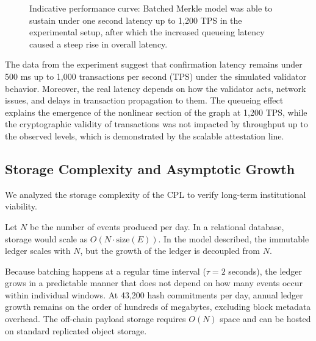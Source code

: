 \documentclass[conference]{IEEEtran}
\begin{document}
\begin{figure}[htbp]
\centering
{}
\caption{Indicative performance curve: Batched Merkle model was able to sustain under one second latency up to 1,200 TPS in the experimental setup, after which the increased queueing latency caused a steep rise in overall latency.}
\label{fig:throughput}
\end{figure}

The data from the experiment suggest that confirmation latency remains under 500 ms up to 1,000 transactions per second (TPS) under the simulated validator behavior. Moreover, the real latency depends on how the validator acts, network issues, and delays in transaction propagation to them. The queueing effect explains the emergence of the nonlinear section of the graph at 1,200 TPS, while the cryptographic validity of transactions was not impacted by throughput up to the observed levels, which is demonstrated by the scalable attestation line.

\subsection{Storage Complexity and Asymptotic Growth}
We analyzed the storage complexity of the CPL to verify long-term institutional viability.

Let $N$ be the number of events produced per day. In a relational database, storage would scale as $O(N \cdot \text{size}(E))$. In the model described, the immutable ledger scales with $N$, but the growth of the ledger is decoupled from $N$.

Because batching happens at a regular time interval ($\tau = 2$ seconds), the ledger grows in a predictable manner that does not depend on how many events occur within individual windows. At 43,200 hash commitments per day, annual ledger growth remains on the order of hundreds of megabytes, excluding block metadata overhead. The off-chain payload storage requires $O(N)$ space and can be hosted on standard replicated object storage.
\end{document}
